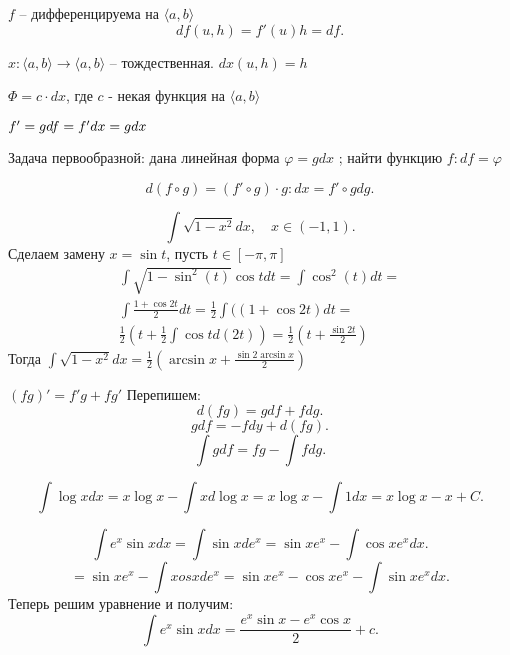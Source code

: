 \documentclass[12pt]{report}
\begin{document}
\begin{defn}[дифференциал]
    $ f $ -- дифференцируема на $ \langle a, b \rangle$ 
    \[
	df(u, h) = f'(u) h = df
    .\] 
\end{defn}
\begin{ex}
    $ x: \langle a, b \rangle \to  \langle a, b \rangle$ -- тождественная. $ dx (u, h)= h$
\end{ex}
\begin{st}
    $ \Phi = c \cdot dx$, где  $ c$ - некая функция на $ \langle a, b \rangle$
\end{st}
$ f' = g \\
df = f' dx = g dx$ 

Задача первообразной: дана линейная форма $ \varphi = g dx$ ; найти функцию $ f: df = \varphi $
\begin{st}
    \[
	d(f \circ g) = (f' \circ g) \cdot g: dx = f' \circ g dg
    .\] 
\end{st}
\begin{ex}
    \[
	\int \sqrt{1 - x^2} dx, \quad x \in  (-1, 1)
    .\] 
    Сделаем замену $ x = \sin t$, пусть $ t \in  [- \pi , \pi]$
    $$
    \begin{array}{c}
	\int \sqrt{1-\sin^2(t)} \cos t dt = \int \cos^2(t) dt =\\
	\int \frac{1 + \cos 2t}{2} dt = \frac{1}{2} \int ((1 + \cos 2t) dt = \\
	\frac{1}{2}(t + \frac{1}{2} \int \cos t d(2t)) = \frac{1}{2} (t + \frac{\sin
	2 t}{2})
    \end{array}
    $$
    Тогда $ \int \sqrt{1 - x^2} dx = \frac{1}{2} (\arcsin x + \frac{\sin 2 \arcsin x}{2})$
\end{ex}
\begin{st}

    $ (fg)' = f'g + fg'$
    Перепишем:
     \[
	 d(fg) = g df + f dg
    .\] 
    \[
	g df = -f dy + d(fg)
    .\] 
    \[
    \int g df = fg - \int f dg
    .\] 
\end{st}
\begin{ex}
    \[
    \int \log x dx = x \log x - \int x d \log x = x \log x - \int 1 dx = x \log x -x + C
    .\] 
\end{ex}
\begin{ex}
    \[
    \int e^{x} \sin x dx = \int \sin x d e^{x} = \sin x e^{ x} - \int \cos x e^{x} dx
    .\] 
    \[
     = \sin x e^{x} - \int xos x d e^{x} = \sin x e^{x} - \cos x e^{ x} - \int \sin x e ^{x} dx
    .\] 
    Теперь решим уравнение и получим:
    \[
	\int e^{x} \sin x dx = \frac{e^{x} \sin x - e^{x} \cos x}{2} + c
    .\] 
\end{ex}
\end{document}
